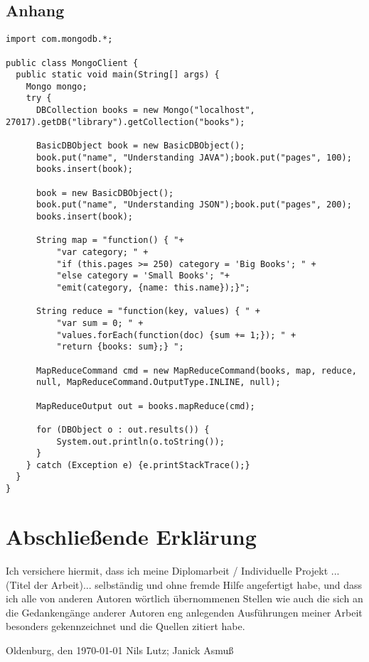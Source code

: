 \newpage
\begin{appendix}

\section{Anhang}
\begin{lstlisting}[caption=MapReduce in Java , label=lst:mapreduce]
import com.mongodb.*;

public class MongoClient {
  public static void main(String[] args) {
    Mongo mongo;
    try {
      DBCollection books = new Mongo("localhost", 27017).getDB("library").getCollection("books");
      
      BasicDBObject book = new BasicDBObject();
      book.put("name", "Understanding JAVA");book.put("pages", 100);
      books.insert(book);
      
      book = new BasicDBObject();
      book.put("name", "Understanding JSON");book.put("pages", 200);
      books.insert(book);
      
      String map = "function() { "+ 
          "var category; " +  
          "if (this.pages >= 250) category = 'Big Books'; " +
          "else category = 'Small Books'; "+  
          "emit(category, {name: this.name});}";
      
      String reduce = "function(key, values) { " +
          "var sum = 0; " +
          "values.forEach(function(doc) {sum += 1;}); " +
          "return {books: sum};} ";
      
      MapReduceCommand cmd = new MapReduceCommand(books, map, reduce,
      null, MapReduceCommand.OutputType.INLINE, null);
      
      MapReduceOutput out = books.mapReduce(cmd);
      
      for (DBObject o : out.results()) {
          System.out.println(o.toString());
      }
    } catch (Exception e) {e.printStackTrace();}
  }
}
\end{lstlisting}

\newpage
{}

\end{appendix}

\newpage
\section*{Abschließende Erklärung}

Ich versichere hiermit, dass ich meine Diplomarbeit / Individuelle Projekt ...(Titel der Arbeit)... selbständig und ohne fremde Hilfe angefertigt habe, und dass ich alle von anderen Autoren wörtlich übernommenen Stellen wie auch die sich an die Gedankengänge anderer Autoren eng anlegenden Ausführungen meiner Arbeit besonders gekennzeichnet und die Quellen zitiert habe.

\vspace*{3cm}
\noindent Oldenburg, den \today \hspace*{2cm} Nils Lutz; Janick Asmuß